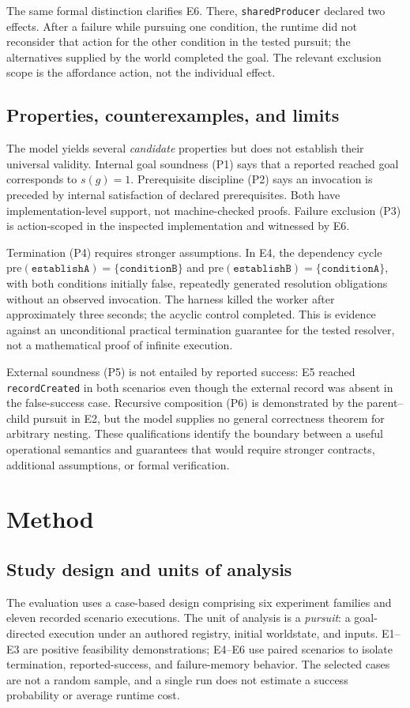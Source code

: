 \documentclass[11pt]{article}
\begin{document}
The same formal distinction clarifies E6. There, \texttt{sharedProducer} declared two effects. After a failure while pursuing one condition, the runtime did not reconsider that action for the other condition in the tested pursuit; the alternatives supplied by the world completed the goal. The relevant exclusion scope is the affordance action, not the individual effect.

\subsection{Properties, counterexamples, and limits}
The model yields several \emph{candidate} properties but does not establish their universal validity. Internal goal soundness (P1) says that a reported reached goal corresponds to $s(g)=1$. Prerequisite discipline (P2) says an invocation is preceded by internal satisfaction of declared prerequisites. Both have implementation-level support, not machine-checked proofs. Failure exclusion (P3) is action-scoped in the inspected implementation and witnessed by E6.

Termination (P4) requires stronger assumptions. In E4, the dependency cycle $\mathrm{pre}(\texttt{establishA})=\{\texttt{conditionB}\}$ and $\mathrm{pre}(\texttt{establishB})=\{\texttt{conditionA}\}$, with both conditions initially false, repeatedly generated resolution obligations without an observed invocation. The harness killed the worker after approximately three seconds; the acyclic control completed. This is evidence against an unconditional practical termination guarantee for the tested resolver, not a mathematical proof of infinite execution.

External soundness (P5) is not entailed by reported success: E5 reached \texttt{recordCreated} in both scenarios even though the external record was absent in the false-success case. Recursive composition (P6) is demonstrated by the parent--child pursuit in E2, but the model supplies no general correctness theorem for arbitrary nesting. These qualifications identify the boundary between a useful operational semantics and guarantees that would require stronger contracts, additional assumptions, or formal verification.

\section{Method}
\subsection{Study design and units of analysis}
The evaluation uses a case-based design comprising six experiment families and eleven recorded scenario executions. The unit of analysis is a \emph{pursuit}: a goal-directed execution under an authored registry, initial worldstate, and inputs. E1--E3 are positive feasibility demonstrations; E4--E6 use paired scenarios to isolate termination, reported-success, and failure-memory behavior. The selected cases are not a random sample, and a single run does not estimate a success probability or average runtime cost.
\end{document}
